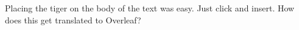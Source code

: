 Placing the tiger on the body of the text was easy. Just click and insert. How does this get translated to Overleaf?